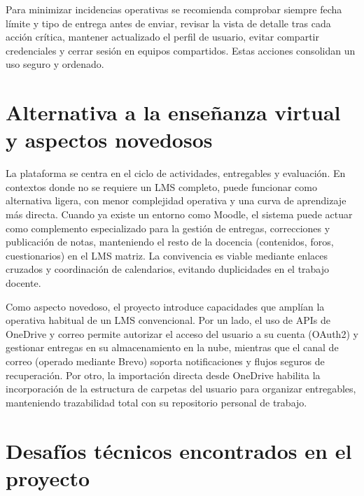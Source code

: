 Para minimizar incidencias operativas se recomienda comprobar siempre fecha l\'imite y tipo de entrega antes de enviar, revisar la vista de detalle tras cada acci\'on cr\'itica, mantener actualizado el perfil de usuario, evitar compartir credenciales y cerrar sesi\'on en equipos compartidos. Estas acciones consolidan un uso seguro y ordenado.

\FloatBarrier

\section{Alternativa a la ense\~nanza virtual y aspectos novedosos}

La plataforma se centra en el ciclo de actividades, entregables y evaluaci\'on. En contextos donde no se requiere un LMS completo, puede funcionar como alternativa ligera, con menor complejidad operativa y una curva de aprendizaje m\'as directa. Cuando ya existe un entorno como Moodle, el sistema puede actuar como complemento especializado para la gesti\'on de entregas, correcciones y publicaci\'on de notas, manteniendo el resto de la docencia (contenidos, foros, cuestionarios) en el LMS matriz. La convivencia es viable mediante enlaces cruzados y coordinaci\'on de calendarios, evitando duplicidades en el trabajo docente.

Como aspecto novedoso, el proyecto introduce capacidades que ampl\'ian la operativa habitual de un LMS convencional. Por un lado, el uso de APIs de OneDrive y correo permite autorizar el acceso del usuario a su cuenta (OAuth2) y gestionar entregas en su almacenamiento en la nube, mientras que el canal de correo (operado mediante Brevo) soporta notificaciones y flujos seguros de recuperaci\'on. Por otro, la importaci\'on directa desde OneDrive habilita la incorporaci\'on de la estructura de carpetas del usuario para organizar entregables, manteniendo trazabilidad total con su repositorio personal de trabajo.
\section{Desaf\'ios t\'ecnicos encontrados en el proyecto}

